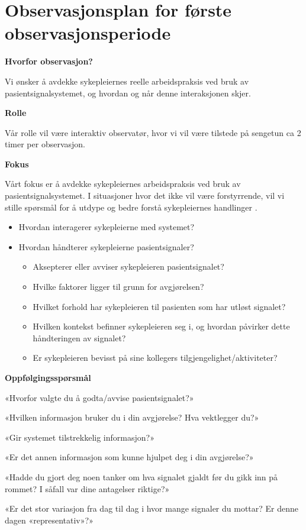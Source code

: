 \chapter{Observasjonsplan for første observasjonsperiode}
\label{chp:appendix_observasjonsplan1}

\textbf{Hvorfor observasjon?}

\noindent
Vi ønsker å avdekke sykepleiernes reelle arbeidspraksis ved bruk av pasientsignalsystemet, og hvordan og når denne interaksjonen skjer. 

\noindent
\textbf{Rolle}

\noindent
Vår rolle vil være interaktiv observatør, hvor vi vil være tilstede på sengetun ca 2 timer per observasjon.

\noindent
\textbf{Fokus}

\noindent
Vårt fokus er å avdekke sykepleiernes arbeidspraksis ved bruk av pasientsignalsystemet. I situasjoner hvor det ikke vil være forstyrrende, vil vi stille spørsmål for å utdype og  bedre forstå sykepleiernes handlinger .

\begin{itemize}
	\item Hvordan interagerer sykepleierne med systemet?
	\item Hvordan håndterer sykepleierne pasientsignaler?
		\begin{itemize}
			\item Aksepterer eller avviser sykepleieren pasientsignalet?
			\item Hvilke faktorer ligger til grunn for avgjørelsen?
			\item Hvilket forhold har sykepleieren til pasienten som har utløst signalet?
			\item Hvilken kontekst befinner sykepleieren seg i, og hvordan påvirker dette håndteringen av signalet?
			\item Er sykepleieren bevisst på sine kollegers tilgjengelighet/aktiviteter?
		\end{itemize}
\end{itemize}

\noindent
\textbf{Oppfølgingsspørsmål}

\noindent
«Hvorfor valgte du å godta/avvise pasientsignalet?»

\noindent
«Hvilken informasjon bruker du i din avgjørelse? Hva vektlegger du?»

\noindent
«Gir systemet tilstrekkelig informasjon?»

\noindent
«Er det annen informasjon som kunne hjulpet deg i din avgjørelse?»

\noindent
«Hadde du gjort deg noen tanker om hva signalet gjaldt før du gikk inn på rommet? I såfall var dine antagelser riktige?»

\noindent
«Er det stor variasjon fra dag til dag i hvor mange signaler du mottar? Er denne dagen «representativ»?»